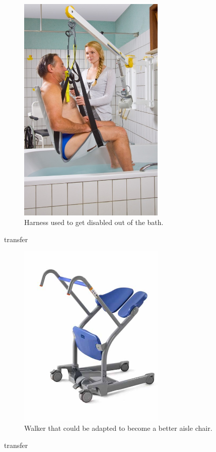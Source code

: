 \begin{figure}[h]
  \centering
     \includegraphics[width=7cm]{images/harness.jpg}
   \caption{Harness used to get disabled out of the bath. \cite{harness}}%
  \label{fig:harness.jpg}
\end{figure} 
transfer

\begin{figure}[h]
  \centering
     \includegraphics[width=7cm]{images/walker.jpg}
   \caption{Walker that could be adapted to become a better aisle chair. \cite{walker}}%
  \label{fig:walker.jpg}
\end{figure} 
transfer

